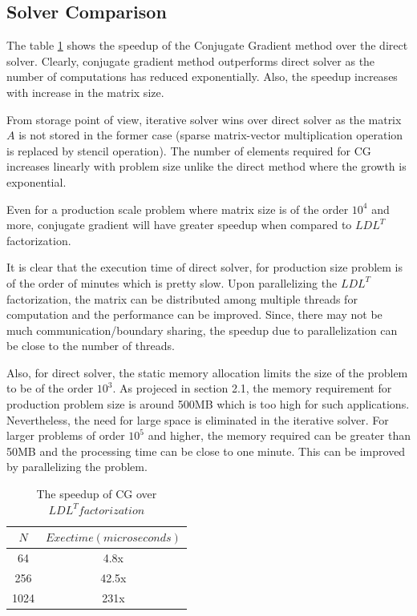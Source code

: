 \documentclass{article}
\begin{document}
\begin{spacing}{1.1}
\section{Solver Comparison}

The table \ref{speedup} shows the speedup of the Conjugate Gradient method over the direct solver. Clearly, conjugate gradient method outperforms direct solver as the number of computations has reduced exponentially. Also, the speedup increases with increase in the matrix size.

From storage point of view, iterative solver wins over direct solver as the matrix $A$ is not stored in the former case (sparse matrix-vector multiplication operation is replaced by stencil operation). The number of elements required for CG increases linearly with problem size unlike the direct method where the growth is exponential.

Even for a production scale problem where matrix size is of the order $10^4$ and more, conjugate gradient will have greater speedup when compared to $LDL^T$ factorization.

It is clear that the execution time of direct solver, for production size problem is of the order of minutes which is pretty slow. Upon parallelizing the $LDL^T$ factorization, the matrix can be distributed among multiple threads for computation and the performance can be improved. Since, there may not be much communication/boundary sharing, the speedup due to parallelization can be close to the number of threads.

Also, for direct solver, the static memory allocation limits the size of the problem to be of the order $10^3$. As projeced in section 2.1, the memory requirement for production problem size is around 500MB which is too high for such applications. Nevertheless, the need for large space is eliminated in the iterative solver. For larger problems of order $10^5$ and higher, the memory required can be greater than 50MB and the processing time can be close to one minute. This can be improved by parallelizing the problem.

\begin{table}[H]
\begin{center}
 \begin{tabular}{| c | c |} 
 \hline
$N$ & $Exec time (microseconds)$  \\ %
 \hline
64 & 4.8x \\ %
256 & 42.5x \\ %
1024 &  231x \\ %
 \hline
\end{tabular}%
\end{center}
\caption{\label{speedup} The speedup of CG over $LDL^T factorization$  } 
\end{table}


\end{spacing}
\end{document}
